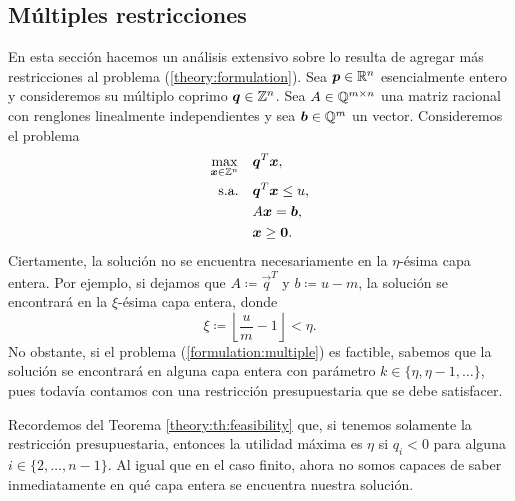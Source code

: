 \subsection{Múltiples restricciones}
\noindent
En esta sección hacemos un análisis extensivo sobre lo resulta de agregar más restricciones al
problema (\ref{theory:formulation}). Sea $\boldsymbol{p} \in \mathbb{R}^n$ esencialmente entero y consideremos su
múltiplo coprimo $\boldsymbol{q} \in \mathbb{Z}^n$. Sea $A \in \mathbb{Q}^{m \times n}$ una matriz racional con renglones
linealmente independientes y sea $\boldsymbol{b} \in \mathbb{Q}^m$ un vector. Consideremos el problema
\begin{subequations}
	\label{formulation:multiple}
	\begin{align}
		\max_{\boldsymbol{x} \in \mathbb{Z}^n} \quad
			& \boldsymbol{q}^T\boldsymbol{x}, \label{formulation:multiple:objective} \\
		\text{s.a.} \quad
			& \boldsymbol{q}^T\boldsymbol{x} \leq u, \label{formulation:multiple:constraint:budget} \\
			& A\boldsymbol{x} = \boldsymbol{b}, \label{formulation:multiple:constraints} \\
			& \boldsymbol{x} \geq \boldsymbol{0}. \nonumber
	\end{align}
\end{subequations}
Ciertamente, la solución no se encuentra necesariamente en la $\eta$-ésima capa entera. Por ejemplo,
si dejamos que $A \coloneq \vec{q}^T$ y $b \coloneq u - m$, la solución se encontrará en la
$\xi$-ésima capa entera, donde
\begin{equation*}
	\xi \coloneq \left\lfloor \frac{u}{m} - 1 \right\rfloor < \eta.
\end{equation*}
No obstante, si el problema (\ref{formulation:multiple}) es factible, sabemos que la solución se
encontrará en alguna capa entera con parámetro $k \in \lbrace \eta, \eta - 1, \ldots \rbrace$, pues
todavía contamos con una restricción presupuestaria que se debe satisfacer.
\begin{observation}
	Recordemos del Teorema \ref{theory:th:feasibility} que, si tenemos solamente la restricción
	presupuestaria, entonces la utilidad máxima es $\eta$ si $q_i < 0$ para alguna $i \in
	\lbrace 2, \ldots, n - 1\rbrace$. Al igual que en el caso finito, ahora no somos capaces de
	saber inmediatamente en qué capa entera se encuentra nuestra solución.
\end{observation}

